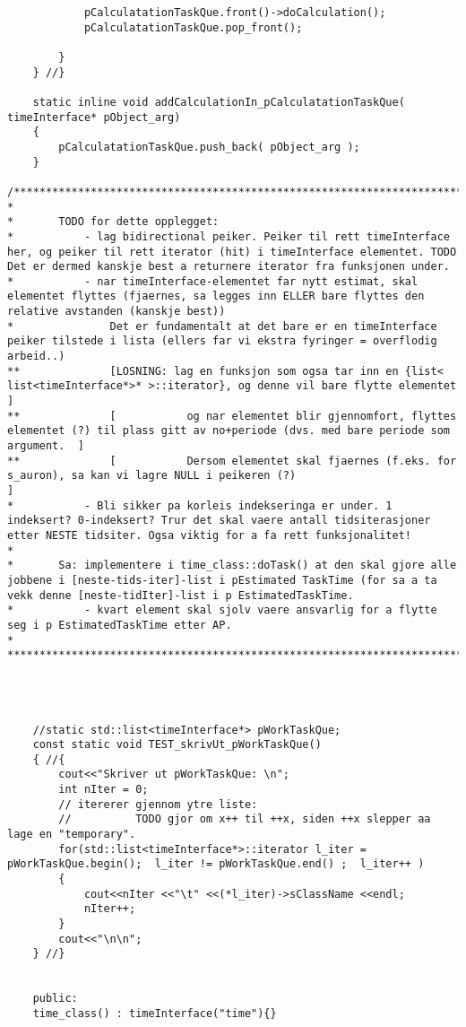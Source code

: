 \begin{lstlisting}
			pCalculatationTaskQue.front()->doCalculation();
			pCalculatationTaskQue.pop_front();
		
		}
	} //}

	static inline void addCalculationIn_pCalculatationTaskQue( timeInterface* pObject_arg)
	{
	 	pCalculatationTaskQue.push_back( pObject_arg );
	}

/***************************************************************************
*
* 		TODO for dette opplegget:
* 			- lag bidirectional peiker. Peiker til rett timeInterface her, og peiker til rett iterator (hit) i timeInterface elementet. TODO Det er dermed kanskje best a returnere iterator fra funksjonen under.
* 			- nar timeInterface-elementet far nytt estimat, skal elementet flyttes (fjaernes, sa legges inn ELLER bare flyttes den relative avstanden (kanskje best))
* 				Det er fundamentalt at det bare er en timeInterface peiker tilstede i lista (ellers far vi ekstra fyringer = overflodig arbeid..) 
** 				[LOSNING: lag en funksjon som ogsa tar inn en {list< list<timeInterface*>* >::iterator}, og denne vil bare flytte elementet 			]
** 				[ 			og nar elementet blir gjennomfort, flyttes elementet (?) til plass gitt av no+periode (dvs. med bare periode som argument. 	]
** 				[ 			Dersom elementet skal fjaernes (f.eks. for s_auron), sa kan vi lagre NULL i peikeren (?) 									]
* 			- Bli sikker pa korleis indekseringa er under. 1 indeksert? 0-indeksert? Trur det skal vaere antall tidsiterasjoner etter NESTE tidsiter. Ogsa viktig for a fa rett funksjonalitet!
*
* 		Sa: implementere i time_class::doTask() at den skal gjore alle jobbene i [neste-tids-iter]-list i pEstimated TaskTime (for sa a ta vekk denne [neste-tidIter]-list i p EstimatedTaskTime.
* 			- kvart element skal sjolv vaere ansvarlig for a flytte seg i p EstimatedTaskTime etter AP.
*
****************************************************************************/




	//static std::list<timeInterface*> pWorkTaskQue;
	const static void TEST_skrivUt_pWorkTaskQue()
	{ //{
		cout<<"Skriver ut pWorkTaskQue: \n";
		int nIter = 0;
		// itererer gjennom ytre liste:
		//			TODO gjor om x++ til ++x, siden ++x slepper aa lage en "temporary".
		for(std::list<timeInterface*>::iterator l_iter = pWorkTaskQue.begin(); 	l_iter != pWorkTaskQue.end() ; 	l_iter++ )
		{
			cout<<nIter <<"\t" <<(*l_iter)->sClassName <<endl;
			nIter++;
		}
		cout<<"\n\n";
	} //}


	public:
	time_class() : timeInterface("time"){}


\end{lstlisting}
